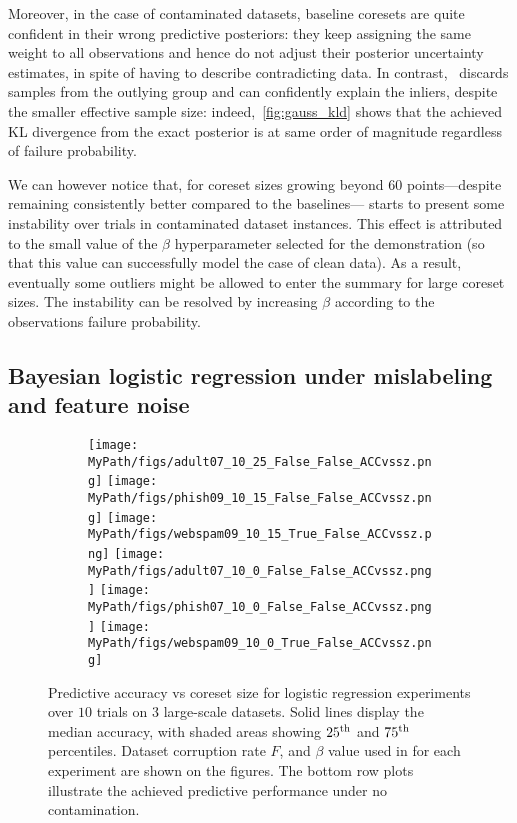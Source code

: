 Moreover, in the case of contaminated datasets, baseline coresets are quite confident in their wrong predictive posteriors: they keep assigning the same weight to all observations and hence do not adjust their posterior uncertainty estimates, in spite of having to describe contradicting data. In contrast,~\bcores{} discards samples from the outlying group and can confidently explain the inliers, despite the smaller effective sample size: indeed,~\cref{fig:gauss_kld} shows that the achieved KL divergence from the exact posterior is at same order of magnitude regardless of failure probability. 

We can however notice that, for coreset sizes growing beyond 60 points---despite remaining consistently better compared to the baselines---\bcores{} starts to present some instability over trials in contaminated dataset instances. This effect is attributed to the small value of the $\beta$ hyperparameter  selected for the demonstration (so that this value can successfully model the case of clean data). As a result, eventually some outliers might be allowed to enter the summary for large coreset sizes. The instability can be resolved by increasing $\beta$ according to the observations failure probability. 


\subsection{Bayesian logistic regression under mislabeling and feature noise}
\label{subsec:logreg-expt}

\begin{figure}[t!]
	\begin{subfigure}[b]{0.9\textwidth} 
		\centering
		\texttt{[image: \\MyPath/figs/adult07\_10\_25\_False\_False\_ACCvssz.png]}
		\centering
		\hfill
		\texttt{[image: \\MyPath/figs/phish09\_10\_15\_False\_False\_ACCvssz.png]}
		\centering
		\hfill
		\texttt{[image: \\MyPath/figs/webspam09\_10\_15\_True\_False\_ACCvssz.png]}
		\centering
		\texttt{[image: \\MyPath/figs/adult07\_10\_0\_False\_False\_ACCvssz.png]}
		\centering
		\hfill
		\texttt{[image: \\MyPath/figs/phish07\_10\_0\_False\_False\_ACCvssz.png]}
		\centering
		\hfill
		\texttt{[image: \\MyPath/figs/webspam09\_10\_0\_True\_False\_ACCvssz.png]}
	\end{subfigure}	
	\centering
	\caption{Predictive accuracy vs coreset size for logistic regression experiments over $10$ trials on $3$ large-scale datasets. Solid lines display the median accuracy, with shaded areas showing $25\textsuperscript{th}$ and $75\textsuperscript{th}$ percentiles. Dataset corruption rate $F$, and $\beta$ value used in \bcores{} for each experiment are shown on the figures. The bottom row plots illustrate the achieved predictive performance under no contamination.}
	\label{fig:logreg_plot}
\end{figure}

